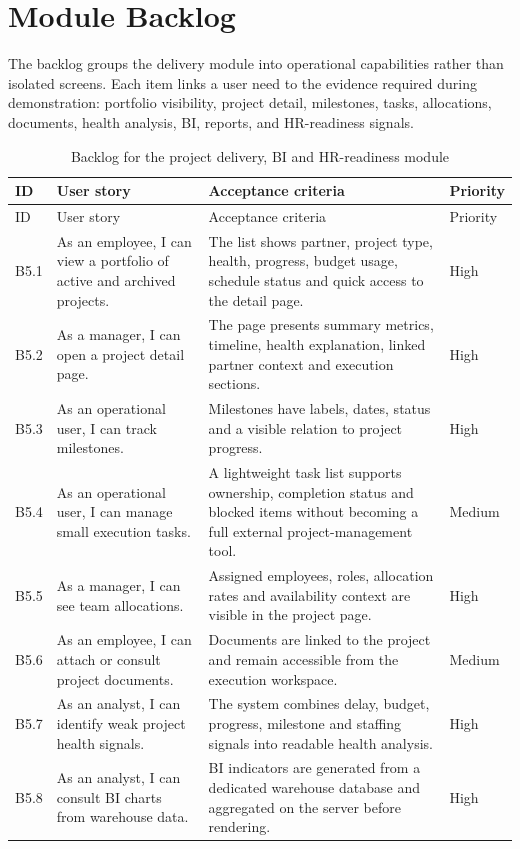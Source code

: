 \section{Module Backlog}
The backlog groups the delivery module into operational capabilities rather than isolated screens. Each item links a user need to the evidence required during demonstration: portfolio visibility, project detail, milestones, tasks, allocations, documents, health analysis, BI, reports, and HR-readiness signals.
\begin{longtable}{p{1.1cm}p{4.2cm}p{6.1cm}p{2.2cm}}
  \caption{Backlog for the project delivery, BI and HR-readiness module}\label{tab:chapter5-backlog} \\
  \toprule
  ID & User story & Acceptance criteria & Priority \\
  \midrule
  \endfirsthead
  \toprule
  ID & User story & Acceptance criteria & Priority \\
  \midrule
  \endhead
  B5.1 & As an employee, I can view a portfolio of active and archived projects. & The list shows partner, project type, health, progress, budget usage, schedule status and quick access to the detail page. & High \\
  B5.2 & As a manager, I can open a project detail page. & The page presents summary metrics, timeline, health explanation, linked partner context and execution sections. & High \\
  B5.3 & As an operational user, I can track milestones. & Milestones have labels, dates, status and a visible relation to project progress. & High \\
  B5.4 & As an operational user, I can manage small execution tasks. & A lightweight task list supports ownership, completion status and blocked items without becoming a full external project-management tool. & Medium \\
  B5.5 & As a manager, I can see team allocations. & Assigned employees, roles, allocation rates and availability context are visible in the project page. & High \\
  B5.6 & As an employee, I can attach or consult project documents. & Documents are linked to the project and remain accessible from the execution workspace. & Medium \\
  B5.7 & As an analyst, I can identify weak project health signals. & The system combines delay, budget, progress, milestone and staffing signals into readable health analysis. & High \\
  B5.8 & As an analyst, I can consult BI charts from warehouse data. & BI indicators are generated from a dedicated warehouse database and aggregated on the server before rendering. & High \\

\end{longtable}
